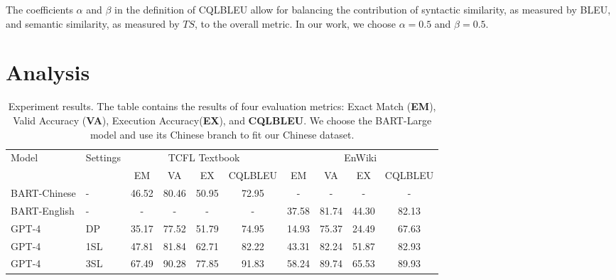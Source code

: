 \documentclass[11pt]{article}
\begin{document}
\begin{CJK*}{UTF8}{gbsn}
The coefficients $\alpha$ and $\beta$ in the definition of CQLBLEU allow for balancing the contribution of syntactic similarity, as measured by BLEU, and semantic similarity, as measured by $TS$, to the overall metric. In our work, we choose $\alpha = 0.5$ and $\beta = 0.5$. 

\section{Analysis}

\begin{table*}[ht]
\centering
\begin{tabular}{lp{2em}cccccccc}
\toprule
\multirow{2}{*}{Model} & \multirow{2}{*}{Settings} & \multicolumn{4}{c}{TCFL Textbook} & \multicolumn{4}{c}{EnWiki} \\
\cmidrule(lr){3-6} \cmidrule(lr){7-10}
      &          & EM & VA & EX & CQLBLEU & EM & VA & EX & CQLBLEU \\
\midrule
BART-Chinese & - & 46.52 & 80.46& 50.95 & 72.95 & - & -& -& - \\
BART-English         & - & - & - & - & - & 37.58 & 81.74 & 44.30 & 82.13 \\
GPT-4 & DP & 35.17 & 77.52 & 51.79 & 74.95 & 14.93 & 75.37 & 24.49 & 67.63 \\
GPT-4 & 1SL & 47.81 & 81.84 & 62.71 & 82.22 & 43.31 & 82.24 & 51.87 & 82.93 \\
GPT-4 & 3SL & 67.49 & 90.28 & 77.85 & 91.83 & 58.24 & 89.74 & 65.53 & 89.93\\
\bottomrule
\end{tabular}
\caption{Experiment results. The table contains the results of four evaluation metrics: Exact Match (\textbf{EM}), Valid Accuracy (\textbf{VA}), Execution Accuracy(\textbf{EX}), and \textbf{CQLBLEU}. We choose the BART-Large model and use its Chinese branch to fit our Chinese dataset.}
\label{tab:model_performance}
\end{table*}



\end{CJK*}
\end{document}

